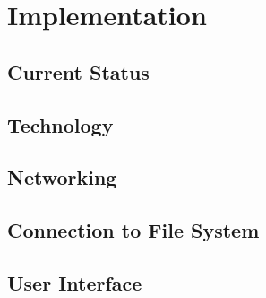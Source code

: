 \chapter{Implementation}

\section{Current Status}

\section{Technology}

\section{Networking}

\section{Connection to File System}

\section{User Interface}